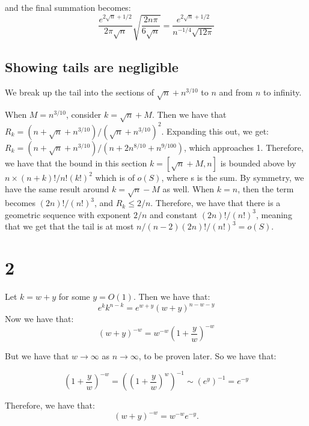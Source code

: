 \documentclass[]{article}
\begin{document}
and the final summation becomes:
\begin{equation}
	\frac{e^{2\sqrt{n} + 1/2}}{2 \pi \sqrt{n}} 
	\sqrt{\frac{2n \pi}{6 \sqrt{n}}}
	= 
	\frac{e^{2 \sqrt{n} + 1/2} }{n^{-1/4} \sqrt{12 \pi} }
\end{equation}


\subsection{Showing tails are negligible}
We break up the tail into the sections of $\sqrt{n} + n^{3/10}$ to $n$ and from $n$ to infinity.

When $M  = n^{3/10}$, consider $k = \sqrt{n} + M$. Then we have that
$R_k = (n + \sqrt{n}+ n^{3/10})/(\sqrt{n} + n^{3/10})^2$. Expanding this out, we get:
$R_k = (n + \sqrt{n} + n^{3/10})/(n + 2 n^{8/10} + n^{9/100})$, which approaches 1. Therefore, we have that the bound in this section $k = [\sqrt{n} + M, n]$ is bounded above by $n \times (n + k)!/n! (k!)^2$ which is of $o(S)$, where s is the sum. By symmetry, we have the same result around $k = \sqrt{n} - M$ as well. 
When $k = n$, then the term becomes $(2n)!/ (n!)^3$, and $R_k \leq 2/n$. Therefore,
we have that there is a geometric sequence with exponent $2/n$ and constant $(2n)!/(n!)^3$, meaning that we get that the tail is at most $n/(n - 2) (2n)!/(n!)^3 = o(S)$. 

\section{2}
Let $k = w + y$ for some $y = O(1)$. Then we have that:
\begin{equation}
	e^{k} k^{n - k} = e^{w + y} (w + y)^{n - w - y}
\end{equation}
Now we have that:
\begin{equation}
	(w + y)^{-w} = w^{-w} \left(1 + \frac{y}{w}\right)^{-w}
\end{equation}

But we have that $w \rightarrow \infty$ as $n \rightarrow \infty$, to be proven later. So we have that: 

\begin{equation}
	\left(1 + \frac{y}{w}\right)^{-w} = \left(\left(1 + \frac{y}{w}\right)^{w}\right)^{-1} \sim \left(e^{y}\right)^{-1} = e^{-y}
\end{equation}

Therefore, we have that:
\begin{equation}
	(w + y)^{-w} = w^{-w} e^{-y}.
\end{equation}
\end{document}
